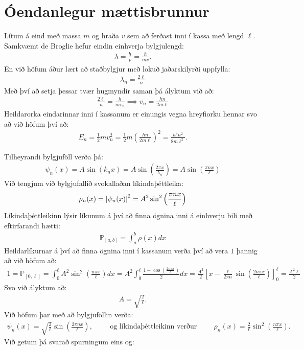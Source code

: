 \section{Óendanlegur mættisbrunnur}

Lítum á eind með massa $m$ og hraða $v$ sem að ferðast inni í kassa með lengd $\ell$. Samkvæmt de Broglie hefur eindin einhverja bylgjulengd:
\begin{align*}
    \lambda = \frac{h}{p} = \frac{h}{mv}.
\end{align*}
En við höfum áður lært að staðbylgjur með lokuð jaðarskilyrði uppfylla:
\begin{align*}
    \lambda_n = \frac{2\ell}{n}
\end{align*}
Með því að setja þessar tvær hugmyndir saman þá ályktum við að:
\begin{align*}
    \frac{2\ell}{n} = \frac{h}{mv_n} \implies v_n = \frac{hn}{2m\ell}
\end{align*}
Heildarorka eindarinnar inni í kassanum er einungis vegna hreyfiorku hennar svo að við höfum því að:
\begin{align*}
    E_n = \frac{1}{2}mv_n^2 = \frac{1}{2}m \left( \frac{hn}{2m\ell} \right)^2 = \frac{h^2n^2}{8m\ell^2}.
\end{align*}

Tilheyrandi bylgjuföll verða þá:
\begin{align*}
    \psi_n(x) = A\sin(k_nx) = A\sin\left(\frac{2\pi x}{\lambda_n}\right) = A\sin\left( \frac{\pi n x}{\ell} \right)
\end{align*}
Við tengjum við bylgjufallið svokallaðan líkindaþéttleika:
\begin{align*}
    \rho_n(x) = \abs{\psi_n(x)}^2 = A^2 \sin^2\left( \frac{\pi n x}{\ell} \right)
\end{align*}
Líkindaþéttleikinn lýsir líkunum á því að finna ögnina inni á einhverju bili með eftirfarandi hætti:
\begin{align*}
    \mathds{P}_{[a,b]} = \int_{a}^{b} \rho(x)dx  
\end{align*}
Heildarlíkurnar á því að finna ögnina inni í kassanum verða því að vera $1$ þannig að við höfum að:
\begin{align*}
    1 = \mathds{P}_{[0,\ell]} = \int_{0}^{\ell} A^2 \sin^2\left(\frac{n\pi x}{\ell}\right)dx = A^2 \int_{0}^{\ell} \frac{1-\cos\left(\frac{2n\pi x}{\ell}\right)}{2} dx = \frac{A^2}{2}\left[ x - \frac{\ell}{2 \pi n} \sin\left(\frac{2 n \pi x}{\ell}\right) \right]_{0}^{\ell} = \frac{A^2 \ell}{2}
\end{align*}
Svo við ályktum að:
\begin{align*}
    A = \sqrt{\frac{2}{\ell}}.
\end{align*}
Við höfum þar með að bylgjuföllin verða:
\begin{align*}
    \psi_n(x) = \sqrt{\frac{2}{\ell}} \sin\left( \frac{2\pi n x}{\ell} \right), \hspace{1cm} \text{og líkindaþéttleikinn verður} \hspace{1cm} \rho_n(x) = \frac{2}{\ell}\sin^2\left( \frac{n\pi x}{\ell} \right).
\end{align*}
Við getum þá svarað spurningum eins og:

